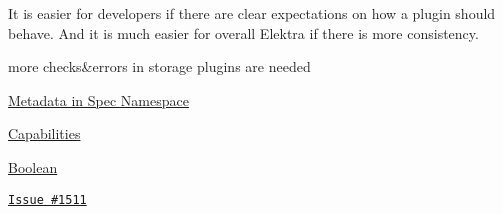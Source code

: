 It is easier for developers if there are clear expectations on how a plugin should behave. And it is much easier for overall Elektra if there is more consistency.


\begin{DoxyItemize}
\item more checks\&errors in storage plugins are needed
\end{DoxyItemize}


\begin{DoxyItemize}
\item \hyperlink{doc_decisions_spec_metadata_md}{Metadata in Spec Namespace}
\item \hyperlink{doc_decisions_capabilities_md}{Capabilities}
\item \hyperlink{doc_decisions_boolean_md}{Boolean}
\end{DoxyItemize}


\begin{DoxyItemize}
\item \href{https://issues.libelektra.org/1511}{\tt Issue \#1511} 
\end{DoxyItemize}